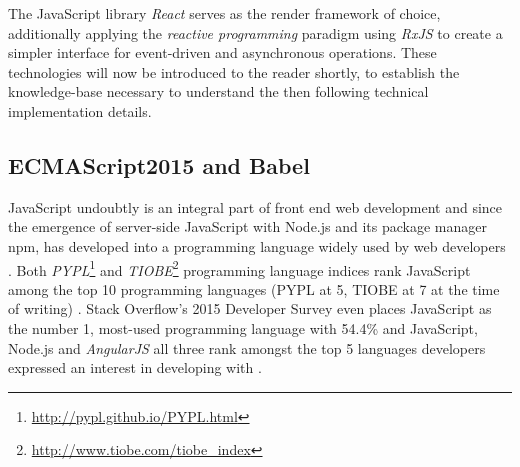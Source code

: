 The JavaScript library \emph{React} \cite{react} serves as the render framework of choice, additionally applying the \emph{reactive programming} paradigm using \emph{RxJS} \cite{rxjs} to create a simpler interface for event-driven and asynchronous operations. These technologies will now be introduced to the reader shortly, to establish the knowledge-base necessary to understand the then following technical implementation details.

\subsection{ECMAScript2015 and Babel}
\label{sec:implementation-technologies-es6}
JavaScript undoubtly is an integral part of front end web development and since the emergence of server-side JavaScript with Node.js and its package manager npm, has developed into a programming language widely used by web developers \cite{gpm-meta-transcompiler}. Both \emph{PYPL}\footnote{\url{http://pypl.github.io/PYPL.html}} and \emph{TIOBE}\footnote{\url{http://www.tiobe.com/tiobe_index}} programming language indices rank JavaScript among the top 10 programming languages (PYPL at 5, TIOBE at 7 at the time of writing) \cite{gpm-meta-transcompiler}. Stack Overflow's 2015 Developer Survey even places JavaScript as the number 1, most-used programming language with 54.4\% and JavaScript, Node.js and \emph{AngularJS} \cite{angularjs} all three rank amongst the top 5 languages developers expressed an interest in developing with \cite{stackoverflow-developer-survey}.

